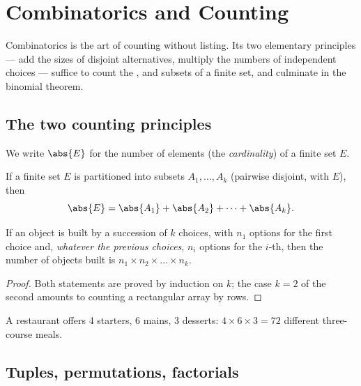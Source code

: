 \chapter{Combinatorics and Counting}\label{ch:g12:comb}

Combinatorics is the art of counting without listing. Its two elementary
principles --- add the sizes of disjoint alternatives, multiply the numbers
of independent choices --- suffice to count the , 
and subsets of a finite set, and culminate in the binomial theorem.

\section{The two counting principles}

We write $\abs{E}$ for the number of elements (the \emph{cardinality}) of a
finite set $E$.

\begin{proposition}\label{prop:g12:comb:addition}
If a finite set $E$ is partitioned into subsets $A_1, \dots, A_k$ (pairwise
disjoint, with  $E$), then
\[
\abs{E} = \abs{A_1} + \abs{A_2} + \dots + \abs{A_k}.
\]
\end{proposition}

\begin{proposition}\label{prop:g12:comb:multiplication}
If an object is built by a succession of $k$ choices, with $n_1$ options for
the first choice and, \emph{whatever the previous choices}, $n_i$ options for
the $i$-th, then the number of objects built is
$n_1 \times n_2 \times \dots \times n_k$.
\end{proposition}

\begin{proof}
Both statements are proved by induction on $k$; the case $k = 2$ of the
second amounts to counting a rectangular array by rows.
\end{proof}

\begin{example}
A restaurant offers 4 starters, 6 mains, 3 desserts: $4 \times 6 \times 3 =
72$ different three-course meals.
\end{example}

\section{Tuples, permutations, factorials}

